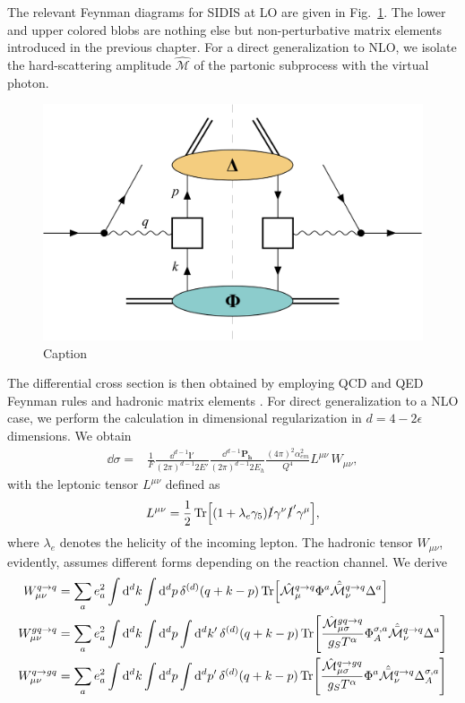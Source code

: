 \noindent The relevant Feynman diagrams for SIDIS at LO are given in Fig.~\ref{fig:amplitudes SIDIS LO}. The lower and upper colored blobs are nothing else but non-perturbative matrix elements introduced in the previous chapter. For a direct generalization to NLO, we isolate the hard-scattering amplitude $\hat{\mathcal{M}}$ of the partonic subprocess with the virtual photon.
\begin{figure}
    \centering
    \includegraphics[width=0.5\linewidth]{fig/SIDIS q2q v2.png}
    \caption{Caption}
    \label{fig:amplitudes SIDIS LO}
\end{figure}
\noindent The differential cross section is then obtained by employing QCD and QED Feynman rules and hadronic matrix elements \cite{Weinberg_1995}. For direct generalization to a NLO case, we perform the calculation in dimensional regularization in $d=4-2\epsilon$ dimensions. We obtain
\begin{equation}\label{eq:dsigma general master formula}
\begin{aligned}
        \dd \sigma = &\frac{1}{F}\frac{\dd ^{d-1}\boldsymbol l'}{(2\pi)^{d-1} 2E'}\frac{\dd^{d-1}\boldsymbol {P_h}}{(2\pi)^{d-1} 2E_h}\frac{(4\pi)^2\alpha_{em}^2}{Q^4}L^{\mu\nu} \,W_{\mu\nu},
\end{aligned}
\end{equation}
with the leptonic tensor $L^{\mu\nu}$ defined as
\begin{equation}
            L^{\mu\nu}=\frac{1}{2}\Tr[(1+\lambda_e\gamma_5)\slashed{l}\gamma^\nu \slashed{l}'\gamma^\mu],
\end{equation}
where $\lambda_e$ denotes the helicity of the incoming lepton. The hadronic tensor $W_{\mu\nu}$, evidently, assumes different forms depending on the reaction channel. We derive 
\begin{equation}
\begin{aligned}
        W_{\mu\nu}^{q \to q}&=\sum_a  e_a^2\int\dd^d k\int \dd^{d}p\,\delta^{(d)}(q+k-p)\Tr[\hat{\mathcal{M}}_\mu^{q\to q} \Phi^a\hat{\bar{\mathcal{M}}}_\nu^{q\to q}\Delta^a]\\
        W_{\mu\nu}^{gq \to q}&=\sum_a e_a^2\int\dd^d k\int \dd^{d}p\int \dd^{d}k'\,\delta^{(d)}(q+k-p)\Tr[\frac{\hat{\mathcal{M}}_{\mu\sigma}^{gq\to q}}{g_S T^\alpha} \Phi_A^{\sigma,a}\hat{\bar{\mathcal{M}}}_\nu^{q\to q}\Delta^a]\\
        W_{\mu\nu}^{q \to gq}&= \sum_a e_a^2\int\dd^d k\int \dd^{d}p\int \dd^{d}p'\,\delta^{(d)}(q+k-p)\Tr[\frac{\hat{\mathcal{M}}_{\mu\sigma}^{q\to g q}}{g_S T^\alpha} \Phi^{a}\hat{\bar{\mathcal{M}}}_\nu^{q\to q}\Delta_A^{\sigma,a}]
        \end{aligned}
\end{equation}
